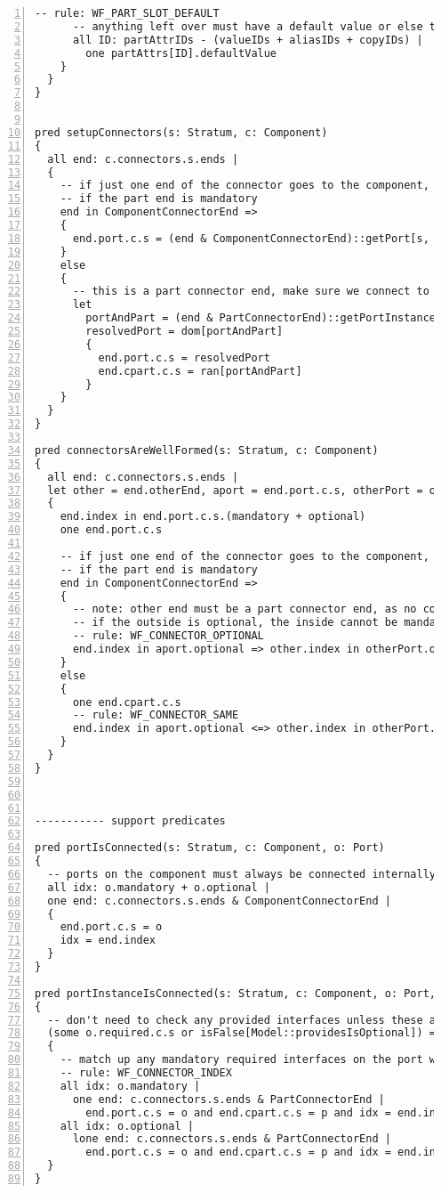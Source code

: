 \begin{lstlisting}[caption={bb\_well\_formed.als}, numbers=left]
      -- rule: WF_PART_SLOT_DEFAULT
      -- anything left over must have a default value or else the parts attribute is unspecified
      all ID: partAttrIDs - (valueIDs + aliasIDs + copyIDs) |
        one partAttrs[ID].defaultValue
    }
  }  
} 


pred setupConnectors(s: Stratum, c: Component)
{
  all end: c.connectors.s.ends |
  {
    -- if just one end of the connector goes to the component, it must be mandatory
    -- if the part end is mandatory
    end in ComponentConnectorEnd =>
    {
      end.port.c.s = (end & ComponentConnectorEnd)::getPort[s, c]
    }
    else
    {
      -- this is a part connector end, make sure we connect to a single port instance
      let
        portAndPart = (end & PartConnectorEnd)::getPortInstance[s, c],
        resolvedPort = dom[portAndPart]
        {
          end.port.c.s = resolvedPort
          end.cpart.c.s = ran[portAndPart]
        }
    }
  }
}

pred connectorsAreWellFormed(s: Stratum, c: Component)
{
  all end: c.connectors.s.ends |
  let other = end.otherEnd, aport = end.port.c.s, otherPort = other.port.c.s |
  {
    end.index in end.port.c.s.(mandatory + optional)
    one end.port.c.s
    
    -- if just one end of the connector goes to the component, it must be mandatory
    -- if the part end is mandatory
    end in ComponentConnectorEnd =>
    {
      -- note: other end must be a part connector end, as no component to component connectors are allowed
      -- if the outside is optional, the inside cannot be mandatory...
      -- rule: WF_CONNECTOR_OPTIONAL
      end.index in aport.optional => other.index in otherPort.optional
    }
    else
    {
      one end.cpart.c.s
      -- rule: WF_CONNECTOR_SAME
      end.index in aport.optional <=> other.index in otherPort.optional
    }
  }
}



----------- support predicates

pred portIsConnected(s: Stratum, c: Component, o: Port)
{
  -- ports on the component must always be connected internally
  all idx: o.mandatory + o.optional |
  one end: c.connectors.s.ends & ComponentConnectorEnd |
  {
    end.port.c.s = o
    idx = end.index
  }
}

pred portInstanceIsConnected(s: Stratum, c: Component, o: Port, p: Part)
{
  -- don't need to check any provided interfaces unless these are not optional
  (some o.required.c.s or isFalse[Model::providesIsOptional]) =>
  {
    -- match up any mandatory required interfaces on the port with a single connector
    -- rule: WF_CONNECTOR_INDEX
    all idx: o.mandatory |
      one end: c.connectors.s.ends & PartConnectorEnd |
        end.port.c.s = o and end.cpart.c.s = p and idx = end.index
    all idx: o.optional |
      lone end: c.connectors.s.ends & PartConnectorEnd |
        end.port.c.s = o and end.cpart.c.s = p and idx = end.index
  }
}

\end{lstlisting}
